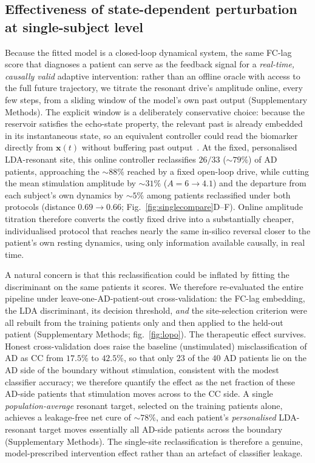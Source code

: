 \documentclass[11pt]{article}
\begin{document}
\subsection*{Effectiveness of state-dependent perturbation at single-subject
level}

Because the fitted model is a closed-loop dynamical system, the same FC-lag score
that diagnoses a patient can serve as the feedback signal for a \emph{real-time,
causally valid} adaptive intervention: rather than an offline oracle with access to
the full future trajectory, we titrate the resonant drive's amplitude online, every
few steps, from a sliding window of the model's own past output (Supplementary Methods). The
explicit window is a deliberately conservative choice: because the reservoir
satisfies the echo-state property, the relevant past is already embedded in its
instantaneous state, so an equivalent controller could read the biomarker
directly from $\mathbf{x}(t)$ without buffering past
output~\cite{albore2025search}.
At the fixed, personalised LDA-resonant site, this online controller
reclassifies $26/33$ ($\sim$$79\%$) of AD patients, approaching the $\sim$$88\%$ reached
by a fixed open-loop drive, while cutting the mean stimulation amplitude by
$\sim$$31\%$ ($A=6\to4.1$) and the departure from each subject's own dynamics by
$\sim$$5\%$ among patients reclassified under both protocols (distance
$0.69\!\to\!0.66$; Fig.~\ref{fig:singlecompare}D--F). Online amplitude titration
therefore converts the costly fixed drive into a substantially cheaper,
individualised protocol that reaches nearly the same in-silico reversal closer to
the patient's own resting dynamics, using only information available causally, in
real time.

A natural concern is that this reclassification could be inflated by fitting the
discriminant on the same patients it scores. We therefore re-evaluated the entire
pipeline under leave-one-AD-patient-out cross-validation: the FC-lag embedding,
the LDA discriminant, its decision threshold, \emph{and} the site-selection
criterion were all rebuilt from the training patients only and then applied to the held-out patient (Supplementary Methods; fig.~\ref{fig:lopo}). The therapeutic effect
survives. Honest cross-validation does raise the baseline (unstimulated)
misclassification of AD as CC from $17.5\%$ to $42.5\%$, so that only $23$ of the
$40$ AD patients lie on the AD side of the boundary without stimulation, consistent
with the modest classifier accuracy; we therefore quantify the effect as the net
fraction of these AD-side patients that stimulation moves across to the CC side. A
single \emph{population-average} resonant target, selected on the training patients
alone, achieves a leakage-free net cure of $\sim$$78\%$, and each patient's
\emph{personalised} LDA-resonant target moves essentially all AD-side patients across the boundary (Supplementary Methods). The single-site reclassification is therefore a
genuine, model-prescribed intervention effect rather than an artefact of
classifier leakage.
\end{document}
